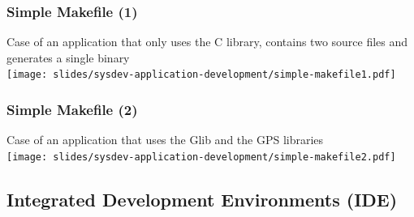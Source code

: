 \begin{frame}[fragile]
  \frametitle{Simple Makefile (1)}
  Case of an application that only uses the C library, contains two source
  files and generates a single binary\\
  \texttt{[image: slides/sysdev-application-development/simple-makefile1.pdf]}
\end{frame}

\begin{frame}[fragile]
  \frametitle{Simple Makefile (2)}
  Case of an application that uses the Glib and the GPS libraries\\
  \texttt{[image: slides/sysdev-application-development/simple-makefile2.pdf]}\\
\end{frame}

\subsection[Source management \& IDEs]{Integrated
  Development Environments (IDE)}

